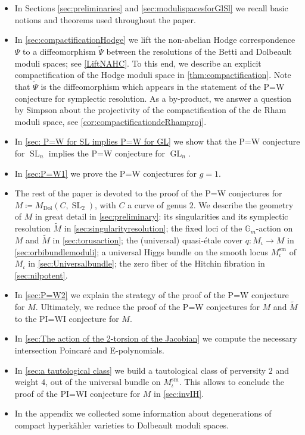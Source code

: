 \documentclass[JEP,XML,SOM,Unicode, NoEqCountersInSection,NoFloatCountersInSection,published]{cedram}
\theoremstyle{definition}
\newcommand{\Gm}{\mathbb{G}_m}
\newcommand{\Gl}{\operatorname{GL}}
\newcommand{\Sl}{\operatorname{SL}}
\begin{document}
\begin{itemize}
\item In Sections \ref{sec:preliminaries} and \ref{sec:modulispacesforGlSl} we recall basic notions and theorems used throughout the paper.
\item In \cref{sec:compactificationHodge} we lift the non-abelian Hodge correspondence $\Psi$ to a diffeomorphism $\widetilde{\Psi}$ between the resolutions of the Betti and Dolbeault moduli spaces; see \cref{LiftNAHC}. To this end, we describe an explicit compactification of the Hodge moduli space in \cref{thm:compactification}. Note that $\widetilde{\Psi}$ is the diffeomorphism which appears in the statement of the P=W conjecture for symplectic resolution. As a by-product, we answer a question by Simpson about the projectivity of the compactification of the de Rham moduli space, see \cref{cor:compactificationdeRhamproj}.
\item In \cref{sec: P=W for SL implies P=W for GL} we show that the P=W conjecture for $\Sl_n$ implies the P=W conjecture for $\Gl_n$.\enlargethispage{1\baselineskip}%
\item In \cref{sec:P=W1} we prove the P=W conjectures for $g=1$.
\item The rest of the paper is devoted to the proof of the P=W conjectures for $M \coloneqq M_{\mathrm{Dol}}(C, \Sl_2)$, with $C$ a curve of genus $2$. We describe the geometry of $M$ in great detail in \cref{sec:preliminary}: its singularities and its symplectic resolution $\widetilde{M}$ in \cref{sec:singularityresolution}; the fixed loci of the $\Gm$\nobreakdash-action on $M$ and $\widetilde{M}$ in \cref{sec:torusaction}; the (universal) quasi-étale cover $q\colon M_{\iota} \to M$ in \cref{sec:orbibundlemoduli}; a universal Higgs bundle on the smooth locus $M^{\mathrm{sm}}_{\iota}$ of $M_{\iota}$ in \cref{sec:Universalbundle}; the zero fiber of the Hitchin fibration in \cref{sec:nilpotent}.
\item In \cref{sec:P=W2} we explain the strategy of the proof of the P=W conjecture for $M$. Ultimately, we reduce the proof of the P=W conjectures for $M$ and $\widetilde{M}$ to the PI=WI conjecture for $M$.
\item In \cref{sec:The action of the 2-torsion of the Jacobian} we compute the necessary intersection Poincaré and E\nobreakdash-poly\-no\-mials.
\item In \cref{sec:a tautological class} we build a tautological class of perversity $2$ and weight $4$, out of the universal bundle on $M^{\mathrm{sm}}_{\iota}$. This allows to conclude the proof of the PI=WI conjecture for $M$ in \cref{sec:invIH}.
\item In the appendix we collected some information about degenerations of compact hyperkähler varieties to Dolbeault moduli spaces.
\end{itemize}
\end{document}
